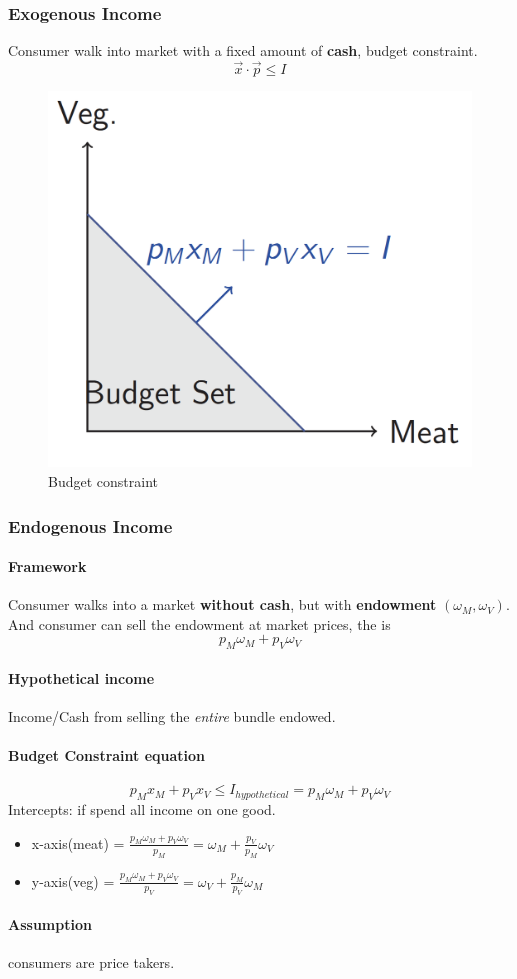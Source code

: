 \documentclass{article}
\begin{document}
	\subsubsection{Exogenous Income} Consumer walk into market with a fixed amount of \textbf{cash}, budget constraint.
	\[
	\vec{x} \cdot \vec{p} \leq I
	\]
	\begin{figure}[!htb]
		\centering
		\includegraphics[width=0.3\linewidth]{eco206pic/budget}
		\caption{Budget constraint}
	\end{figure}
	
	\subsubsection{Endogenous Income}
	\paragraph{Framework} Consumer walks into a market \textbf{without cash}, but with \textbf{endowment} $(\omega_M, \omega_V)$. And consumer can sell the endowment at market prices, the  is
	\[
		p_M \omega_M + p_V \omega_V
	\]
	\paragraph{Hypothetical income} Income/Cash from selling the \emph{entire} bundle endowed. 
	\paragraph{Budget Constraint equation}
	\[
		p_M x_M + p_V x_V \leq I_{hypothetical} = p_M \omega_M + p_V \omega_V
	\]
	Intercepts: if spend all income on one good.
	\begin{itemize}
		\item x-axis(meat) = $\frac{p_M \omega_M + p_V \omega_V}{p_M} = \omega_M + \frac{p_V}{p_M}\omega_V$
		\item y-axis(veg) = $\frac{p_M \omega_M + p_V \omega_V}{p_V} = \omega_V + \frac{p_M}{p_V}\omega_M$
	\end{itemize}
	\paragraph{Assumption} consumers are price takers.
\end{document}
